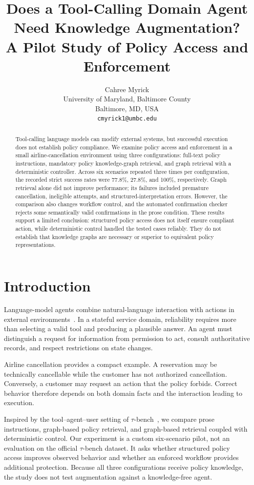 \documentclass[11pt]{article}
\title{Does a Tool-Calling Domain Agent Need Knowledge Augmentation?\\
\large A Pilot Study of Policy Access and Enforcement}
\author{Cahree Myrick\\University of Maryland, Baltimore County\\Baltimore, MD, USA\\\texttt{cmyrick1@umbc.edu}}
\date{}
\begin{document}
\maketitle

\begin{abstract}
Tool-calling language models can modify external systems, but successful execution does not establish policy compliance. We examine policy access and enforcement in a small airline-cancellation environment using three configurations: full-text policy instructions, mandatory policy knowledge-graph retrieval, and graph retrieval with a deterministic controller. Across six scenarios repeated three times per configuration, the recorded strict success rates were 77.8\%, 27.8\%, and 100\%, respectively. Graph retrieval alone did not improve performance; its failures included premature cancellation, ineligible attempts, and structured-interpretation errors. However, the comparison also changes workflow control, and the automated confirmation checker rejects some semantically valid confirmations in the prose condition. These results support a limited conclusion: structured policy access does not itself ensure compliant action, while deterministic control handled the tested cases reliably. They do not establish that knowledge graphs are necessary or superior to equivalent policy representations.
\end{abstract}

\section{Introduction}
Language-model agents combine natural-language interaction with actions in external environments~\cite{yao2023react}. In a stateful service domain, reliability requires more than selecting a valid tool and producing a plausible answer. An agent must distinguish a request for information from permission to act, consult authoritative records, and respect restrictions on state changes.

Airline cancellation provides a compact example. A reservation may be technically cancellable while the customer has not authorized cancellation. Conversely, a customer may request an action that the policy forbids. Correct behavior therefore depends on both domain facts and the interaction leading to execution.

Inspired by the tool--agent--user setting of $\tau$-bench~\cite{yao2024tau}, we compare prose instructions, graph-based policy retrieval, and graph-based retrieval coupled with deterministic control. Our experiment is a custom six-scenario pilot, not an evaluation on the official $\tau$-bench dataset. It asks whether structured policy access improves observed behavior and whether an enforced workflow provides additional protection. Because all three configurations receive policy knowledge, the study does not test augmentation against a knowledge-free agent.
\end{document}

